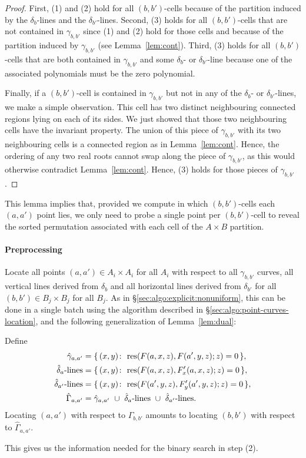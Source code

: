 \begin{proof}
    First, (1) and (2) hold for all \((b,b')\)-cells because of the partition
    induced by the \(\delta_{b}\)-lines and the \(\delta_{b'}\)-lines.
%
    Second, (3) holds for all \((b,b')\)-cells that are not contained in
    \(\gamma_{b,b'}\) since (1) and (2) hold for those cells and because of the
    partition induced by \(\gamma_{b,b'}\) (see Lemma~\ref{lem:cont}).
%
    Third, (3) holds for all $(b,b')$-cells that are both contained in
    \(\gamma_{b,b'}\) and some \(\delta_b\)- or \(\delta_{b'}\)-line because
    one of the associated polynomials must be the zero polynomial.

    Finally, if a $(b,b')$-cell is contained in $\gamma_{b,b'}$ but not
    in any of the \(\delta_{b}\)- or \(\delta_{b'}\)-lines, we make a
    simple observation. This cell has two distinct neighbouring connected
    regions lying on each of its sides. We just showed that those two
    neighbouring cells have the invariant property. The union of this piece of
    $\gamma_{b,b'}$ with its two neighbouring cells is a connected region as in
    Lemma~\ref{lem:cont}. Hence, the ordering of any two real roots cannot swap
    along the piece of $\gamma_{b,b'}$, as this would otherwise
    contradict Lemma~\ref{lem:cont}. Hence, (3) holds for those pieces of
    $\gamma_{b,b'}$.
\end{proof}
This lemma implies that, provided we compute in which $(b,b')$-cells each
$(a,a')$ point lies, we only need to probe a single point per $(b,b')$-cell
to reveal the sorted permutation associated with each cell
of the $A \times B$ partition.


\paragraph{Preprocessing}
Locate all points $(a,a') \in A_i \times A_i$ for all $A_i$ with respect to all
$\gamma_{b,b'}$ curves, all vertical lines derived from $\delta_b$ and all
horizontal lines derived from $\delta_{b'}$ for all $(b,b') \in B_j \times B_j$
for all $B_j$.
%
As in \S\ref{sec:algo:explicit:nonuniform},
this can be done in a single batch using the algorithm described in
\S\ref{sec:algo:point-curves-location},
and the following generalization of Lemma~\ref{lem:dual}:
\begin{lemma}\label{lem:dual:implicit}
Define
\begin{align*}
    \hat{\gamma}_{a,a'} &= \{\, (x,y) \colon\, \operatorname{res}(F(a,x,z),F(a',y,z);z) = 0 \,\},\\
    \hat{\delta}_{a}\text{-lines} &= \{\, (x,y) \colon\, \operatorname{res}(F(a,x,z),F'_x(a,x,z);z) = 0 \,\},\\
    \hat{\delta}_{a'}\text{-lines} &= \{\, (x,y) \colon\, \operatorname{res}(F(a',y,z),F'_y(a',y,z);z) = 0 \,\},\\
    \hat{\Gamma}_{a,a'} &= \hat{\gamma}_{a,a'} \,\,\cup\,\, \hat{\delta}_a\text{-lines} \,\,\cup\,\, \hat{\delta}_{a'}\text{-lines}.
\end{align*}
Locating $(a,a')$ with respect to $\Gamma_{b,b'}$ amounts to
locating $(b,b')$ with respect to $\hat{\Gamma}_{a,a'}$.
\end{lemma}
This gives us the information needed for the binary search in step (2).


